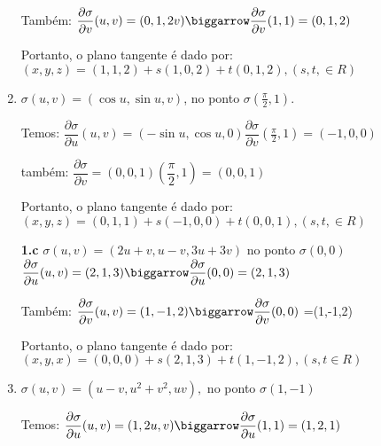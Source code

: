 \documentclass[11pt,a4paper]{article}
\begin{document}
\begin{enumerate}
	Também: \newline
	$\dfrac{\partial \sigma}{\partial v}(u, v)=(0, 1, 2v) \biggarrow \dfrac{\partial \sigma}{\partial v}(1, 1)=(0, 1, 2)$\newline
	
	Portanto, o plano tangente é dado por: \newline
	$(x,y,z)=(1, 1, 2)+s(1, 0, 2)+ t(0, 1, 2), (s, t, \in R)$\newline 
	
	\item $ \sigma (u, v)=(\cos u, \sin u, v)$, no ponto $ \sigma(\frac{\pi}{2},1). $ 
	
	Temos: \newline
	$\dfrac{\partial \sigma}{\partial u}(u, v) = (-\sin u, \cos u, 0)\displaystyle \dfrac{\partial \sigma}{\partial v} (\frac{\pi}{2}, 1)=(-1, 0, 0) $\newline
	
	também: \newline
	$\dfrac{\partial \sigma}{\partial v}=(0, 0, 1) \displaystyle (\dfrac{\pi}{2}, 1)=(0, 0, 1)$\newline
	
	Portanto, o plano tangente é dado por: \newline
    $(x, y, z) = (0, 1, 1)+s(-1, 0, 0)+t(0, 0, 1), (s, t, \in R)$ \newline
    
    \textbf{1.c} $\sigma(u, v)= (2u+v, u-v, 3u+3v)$ no ponto $\sigma (0, 0)$\newline
    $\dfrac{\partial \sigma}{\partial u}(u, v) =(2,1,3) \biggarrow \dfrac{\partial \sigma}{\partial u}(0,0) =(2,1,3)$\newline	
	
	Também: \newline
	$\dfrac{\partial \sigma}{\partial v}(u, v) =(1,-1,2) \biggarrow \dfrac{\partial \sigma}{\partial v}(0,0)$ =(1,-1,2)\newline
	
	Portanto, o plano tangente é dado por: \newline
	$(x,y,x)=(0,0,0)+s(2,1,3)+t(1,-1,2),(s,t\in R)$\newline

	\item $\sigma (u,v)= (u-v,u^{2}+v^{2},uv),$ no ponto $\sigma (1,-1)$
	
	Temos: \newline
    $\dfrac{\partial \sigma}{\partial u}(u, v) =(1,2u,v) \biggarrow \dfrac{\partial \sigma}{\partial u}(1,1) =(1,2,1)$\newline	
    

\end{enumerate}
\end{document}

